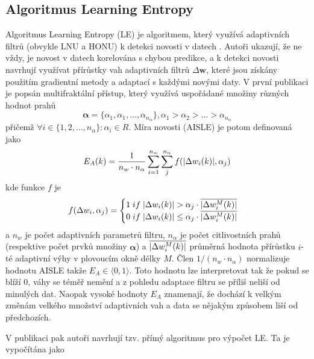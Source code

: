 \subsection{Algoritmus Learning Entropy}\label{chap:LE}
Algoritmus Learning Entropy (LE) je algoritmem, který využívá adaptivních filtrů (obvykle LNU a HONU) k detekci novosti v datech \cite{ivoLE1,ivoLE2}. Autoři ukazují, že ne vždy, je novost v datech korelována s chybou predikce, a k detekci novosti navrhují využívat přírůstky vah adaptivních filtrů $\Delta\textbf{w}$, které jsou získány použitím gradientní metody a adaptací s každými novými daty. V první publikaci \cite{ivoLE1} je popsán multifraktální přístup, který využívá uspořádané množiny různých hodnot prahů
\begin{equation}
\boldsymbol{\alpha}=\{ \alpha_1,\alpha_1,\dots,\alpha_{n_{\alpha}} \}, \alpha_1>\alpha_2>\dots>\alpha_{n_{\alpha}}
\end{equation}
přičemž $\forall i \in \{1,2,\dots,n_{\alpha} \}:\alpha_i\in R$. Míra novosti  (AISLE) je potom definovaná jako
\begin{equation}\label{eq:aisle}
E_A(k)=\frac{1}{n_w\cdot n_{\alpha}}\sum_{i=1}^{n_w}\sum_j^{n_{\alpha}} f(\lvert\Delta w_i(k)\rvert, \alpha_j)
\end{equation}
kde funkce $f$ je
\begin{equation}
f(\Delta w_i, \alpha_j)=\begin{cases}
1 \; if \; \lvert\Delta w_i(k)\rvert>\alpha_{j} \cdot \overline{\lvert\Delta w_i^M(k)\rvert}\\
0 \; if \; \lvert\Delta w_i(k)\rvert\leq \alpha_j \cdot \overline{\lvert\Delta w_i^M(k)\rvert}


\end{cases}
\end{equation}
a $n_w$ je počet adaptivních parametrů filtru, $n_{\alpha}$ je počet citlivostních prahů (respektive počet prvků množiny $\boldsymbol{\alpha}$) a $\overline{\lvert\Delta w_i^M(k)\rvert}$ průměrná hodnota přírůstku $i$-té adaptivní výhy v plovoucím okně délky $M$. Člen $1/(n_w\cdot n_{\alpha})$ normalizuje hodnotu AISLE takže  $E_A \in \langle 0,1\rangle$. Toto hodnotu lze interpretovat tak že pokud se blíží 0, váhy se téměř nemění a z pohledu adaptace filtru se příliš neliší od minulých dat. Naopak vysoké hodnoty $E_A$ znamenají, že dochází k velkým změnám velkého množství adaptivních vah a data se nějakým způsobem liší od předchozích. 
\par
V publikaci \cite{ivoLE2} pak autoři navrhují tzv. přímý algoritmus pro výpočet LE. Ta je vypočítána jako
